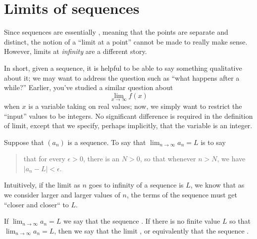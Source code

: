 \documentclass{ximera}
\begin{document}
\section{Limits of sequences}

Since sequences are essentially , meaning that the points
are separate and distinct, the notion of a ``limit at a point'' cannot
be made to really make sense. However, limits at \textit{infinity} are
a different story.

In short, given a sequence, it is helpful to be able to say something
qualitative about it; we may want to address the question such as
``what happens after a while?''  Earlier, you've studied a similar
question about
\[
\lim_{x\to\infty} f(x)
\]
when $x$ is a variable taking on real values; now, we simply want to
restrict the ``input'' values to be integers. No significant
difference is required in the definition of limit, except that we
specify, perhaps implicitly, that the variable is an integer.

\begin{definition}
\label{definition:limit-of-a-sequence}
Suppose that $\left(a_n\right)$ is a sequence.  To say that
$\lim_{n\to \infty}a_n=L$ is to say
\begin{quote}
  that for every $\epsilon>0$, there is an $N > 0$, so that whenever
  $n>N$, we have $|a_n-L|<\epsilon$.
\end{quote}

Intuitively, if the limit as $n$ goes to infinity of a sequence is $L$, we know 
that as we consider larger and larger values of $n$, the terms of the sequence 
must get ``closer and closer`` to $L$.

If $\lim_{n\to\infty}a_n=L$ we say that the sequence
.
If there is no finite value $L$ so that $\lim_{n\to\infty}a_n = L$,
then we say that the limit , or equivalently that
the sequence .
\end{definition} 
\end{document}
